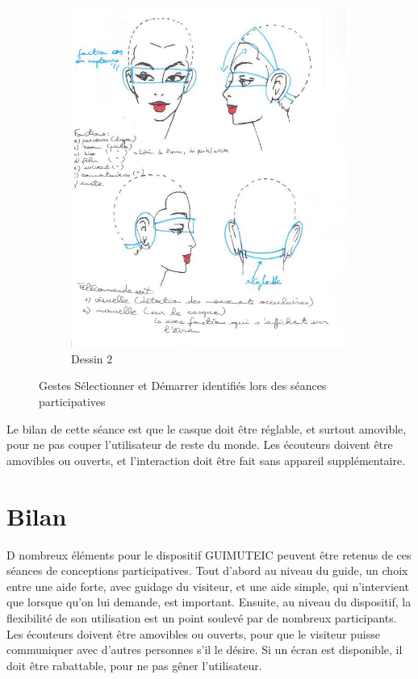 \begin{figure}
\begin{subfigure}{0.32\textwidth}
\includegraphics[width=\columnwidth]{figures/gestes/dessincasque3.png}%
\caption{Dessin 2}
\end{subfigure}


\caption{Gestes Sélectionner et Démarrer identifiés lors des séances participatives}%
\label{fig:dessins}%
\end{figure}


Le bilan de cette séance est que le casque doit être réglable, et surtout amovible, pour ne pas couper l’utilisateur de reste du monde. Les écouteurs doivent être amovibles ou ouverts, et l’interaction doit être fait sans appareil supplémentaire.


\section{Bilan}

D nombreux éléments pour le dispositif GUIMUTEIC peuvent être retenus de ces séances de conceptions participatives.
Tout d’abord au niveau du guide, un choix entre une aide forte, avec guidage du visiteur, et une aide simple, qui n’intervient que lorsque qu’on lui demande, est important.
Ensuite, au niveau du dispositif, la flexibilité de son utilisation est un point soulevé par de nombreux participants.
Les écouteurs doivent être amovibles ou ouverts, pour que le visiteur puisse communiquer avec d’autres personnes s’il le désire.
Si un écran est disponible, il doit être rabattable, pour ne pas gêner l’utilisateur.


